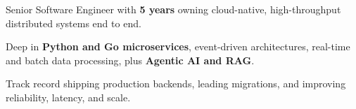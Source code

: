 \begin{zitemize}
    \item Senior Software Engineer with \textbf{5 years} owning cloud-native, high-throughput distributed systems end to end.
    \item Deep in \textbf{Python and Go microservices}, event-driven architectures, real-time and batch data processing, plus \textbf{Agentic AI and RAG}.
    \item Track record shipping production backends, leading migrations, and improving reliability, latency, and scale.
\end{zitemize}
